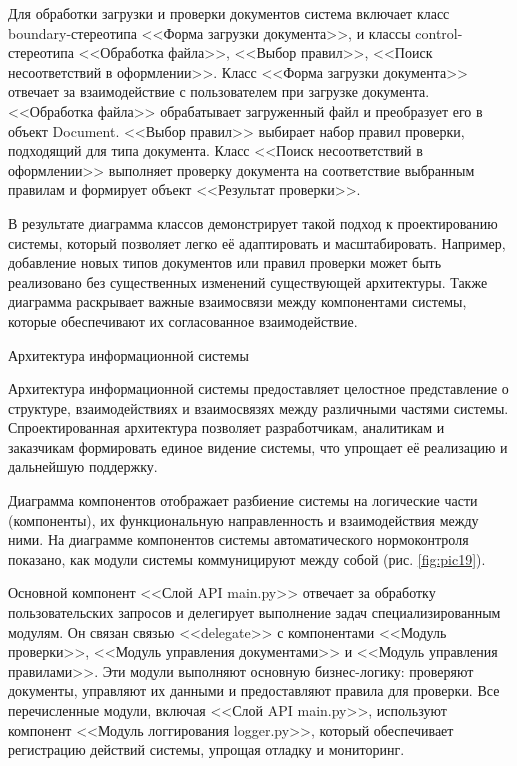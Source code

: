 \documentclass{report}
\begin{document}



Для обработки загрузки и проверки документов система включает класс boundary-стереотипа <<Форма загрузки документа>>, и классы control-стереотипа <<Обработка файла>>, <<Выбор правил>>, <<Поиск несоответствий в оформлении>>. Класс <<Форма загрузки документа>> отвечает за взаимодействие с пользователем при загрузке документа. <<Обработка файла>> обрабатывает загруженный файл и преобразует его в объект Document. <<Выбор правил>> выбирает набор правил проверки, подходящий для типа документа. Класс <<Поиск несоответствий в оформлении>> выполняет проверку документа на соответствие выбранным правилам и формирует объект <<Результат проверки>>. 


В результате диаграмма классов демонстрирует такой подход к проектированию системы, который позволяет легко её адаптировать и масштабировать. Например, добавление новых типов документов или правил проверки может быть реализовано без существенных изменений существующей архитектуры. Также диаграмма раскрывает важные взаимосвязи между компонентами системы, которые обеспечивают их согласованное взаимодействие.

Архитектура информационной системы

Архитектура информационной системы предоставляет целостное представление о структуре, взаимодействиях и взаимосвязях между различными частями системы. Спроектированная архитектура позволяет разработчикам, аналитикам и заказчикам формировать единое видение системы, что упрощает её реализацию и дальнейшую поддержку.

Диаграмма компонентов отображает разбиение системы на логические части (компоненты), их функциональную направленность и взаимодействия между ними. На диаграмме компонентов системы автоматического нормоконтроля показано, как модули системы коммуницируют между \break собой (рис. \ref{fig:pic19}). 


Основной компонент <<Слой API main.py>> отвечает за обработку пользовательских запросов и делегирует выполнение задач специализированным модулям. Он связан связью <<delegate>> с компонентами <<Модуль проверки>>, <<Модуль управления документами>> и <<Модуль управления правилами>>. Эти модули выполняют основную бизнес-логику: проверяют документы, управляют их данными и предоставляют правила для проверки. Все перечисленные модули, включая <<Слой API main.py>>, используют компонент <<Модуль логгирования logger.py>>, который обеспечивает регистрацию действий системы, упрощая отладку и мониторинг.
\end{document}

